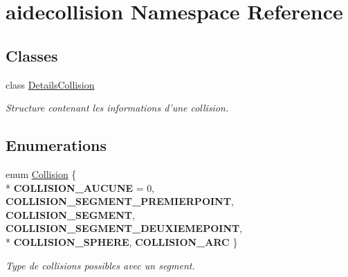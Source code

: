 \hypertarget{namespaceaidecollision}{\section{aidecollision Namespace Reference}
\label{namespaceaidecollision}
}
\subsection*{Classes}
\begin{DoxyCompactItemize}
\item 
class \hyperlink{classaidecollision_1_1_details_collision}{Details\-Collision}
\begin{DoxyCompactList}\small\item\em Structure contenant les informations d'une collision. \end{DoxyCompactList}\end{DoxyCompactItemize}
\subsection*{Enumerations}
\begin{DoxyCompactItemize}
\item 
enum \hyperlink{namespaceaidecollision_a1c8613e2393aa3268262f9d23d60c0c9}{Collision} \{ \\*
{\bfseries C\-O\-L\-L\-I\-S\-I\-O\-N\-\_\-\-A\-U\-C\-U\-N\-E} = 0, 
{\bfseries C\-O\-L\-L\-I\-S\-I\-O\-N\-\_\-\-S\-E\-G\-M\-E\-N\-T\-\_\-\-P\-R\-E\-M\-I\-E\-R\-P\-O\-I\-N\-T}, 
{\bfseries C\-O\-L\-L\-I\-S\-I\-O\-N\-\_\-\-S\-E\-G\-M\-E\-N\-T}, 
{\bfseries C\-O\-L\-L\-I\-S\-I\-O\-N\-\_\-\-S\-E\-G\-M\-E\-N\-T\-\_\-\-D\-E\-U\-X\-I\-E\-M\-E\-P\-O\-I\-N\-T}, 
\\*
{\bfseries C\-O\-L\-L\-I\-S\-I\-O\-N\-\_\-\-S\-P\-H\-E\-R\-E}, 
{\bfseries C\-O\-L\-L\-I\-S\-I\-O\-N\-\_\-\-A\-R\-C}
 \}
\begin{DoxyCompactList}\small\item\em Type de collisions possibles avec un segment. \end{DoxyCompactList}\end{DoxyCompactItemize}
